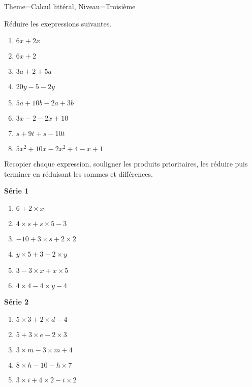 \documentclass[11pt]{article}
\begin{document}
\begin{multicols}{2}
\begin{Maquette}[Fiche]{Theme=Calcul littéral, Niveau=Troisième}
        \begin{exercice}
            Réduire les exepressions suivantes.
            \begin{enumerate}[label=\textbf{\alph*.}]
                \item $6x + 2x$
                \item $6x + 2$
                \item $3a + 2 + 5a$
                \item $20y - 5 -2y$
                \item $5a + 10b - 2a + 3b$
                \item $3x -2 -2x + 10$
                \item $s + 9t + s - 10t$
                \item $5x^2 + 10x - 2x^2 + 4 - x + 1$
            \end{enumerate}
        \end{exercice}

        \columnbreak


        \begin{exercice}
            Recopier chaque expression, souligner les produits prioritaires, les réduire puis terminer en réduisant les sommes et différences.

            \vspace{.3cm}

            \textbf{Série 1}
            \begin{enumerate}[label=\textbf{\alph*.}]
                \item $6 + 2 \times x$
                \item $4 \times s + s \times 5 - 3$
                \item $-10 + 3 \times s + 2 \times 2$
                \item $y \times 5 + 3 - 2 \times y$
                \item $3 - 3 \times x + x \times 5$
                \item $4 \times 4 - 4 \times y - 4$
            \end{enumerate}
            \vspace{.3cm}
            \textbf{Série 2}
            \begin{enumerate}[label=\textbf{\alph*.}]
                \item $5 \times 3 + 2 \times d - 4$
                \item $5 + 3 \times e - 2 \times 3$
                \item $3 \times m - 3 \times m + 4$
                \item $8 \times h - 10 - h \times 7$
                \item $3 \times i + 4 \times 2 - i \times 2$
            \end{enumerate}
        \end{exercice}


\end{Maquette}
\end{multicols}
\end{document}
